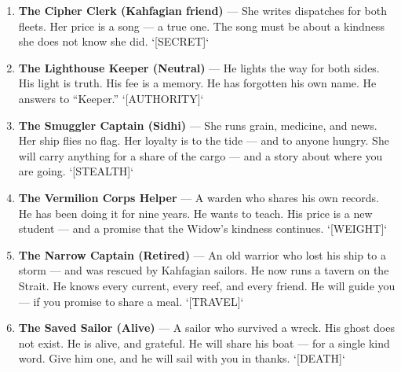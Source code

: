 \begin{enumerate}
\item \textbf{The Cipher Clerk (Kahfagian friend)} --- She writes dispatches for both fleets. Her price is a song --- a true one. The song must be about a kindness she does not know she did. `[SECRET]`
\item \textbf{The Lighthouse Keeper (Neutral)} --- He lights the way for both sides. His light is truth. His fee is a memory. He has forgotten his own name. He answers to ``Keeper.'' `[AUTHORITY]`
\item \textbf{The Smuggler Captain (Sidhi)} --- She runs grain, medicine, and news. Her ship flies no flag. Her loyalty is to the tide --- and to anyone hungry. She will carry anything for a share of the cargo --- and a story about where you are going. `[STEALTH]`
\item \textbf{The Vermilion Corps Helper} --- A warden who shares his own records. He has been doing it for nine years. He wants to teach. His price is a new student --- and a promise that the Widow's kindness continues. `[WEIGHT]`
\item \textbf{The Narrow Captain (Retired)} --- An old warrior who lost his ship to a storm --- and was rescued by Kahfagian sailors. He now runs a tavern on the Strait. He knows every current, every reef, and every friend. He will guide you --- if you promise to share a meal. `[TRAVEL]`
\item \textbf{The Saved Sailor (Alive)} --- A sailor who survived a wreck. His ghost does not exist. He is alive, and grateful. He will share his boat --- for a single kind word. Give him one, and he will sail with you in thanks. `[DEATH]`
\end{enumerate}

